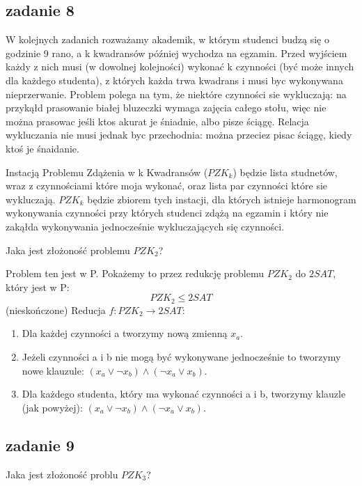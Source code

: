\documentclass[svgnames]{report}
\begin{document}
\subsection{zadanie 8}
\begin{framed}
W kolejnych zadanich rozważamy akademik, w którym studenci budzą się o godzinie 9 rano, a k kwadransów później wychodza na egzamin. Przed wyjściem każdy z nich musi (w dowolnej kolejności) wykonać k czynności (być może innych dla każdego studenta), z których każda trwa kwadrans i musi byc wykonywana nieprzerwanie. Problem polega na tym, że niektóre czynności sie wykluczają: na przykąłd prasowanie białej bluzeczki wymaga zajęcia całego stołu, więc nie można prasowac jeśli ktos akurat je śniadnie, albo pisze ściągę. Relacja wykluczania nie musi jednak byc przechodnia: można przeciez pisac ściągę, kiedy ktoś je śnaidanie.

Instacją Problemu Zdążenia w k Kwadransów ($PZK_k$) będzie lista studnetów, wraz z czynnościami które moja wykonać, oraz lista par czynności które sie wykluczają. $PZK_k$ będzie zbiorem tych instacji, dla których istnieje harmonogram wykonywania czynności przy których studenci zdążą na egzamin i który nie zakąłda wykonywania jednocześnie wykluczających się czynności.

Jaka jest złożoność problemu $PZK_2$?
\end{framed}

Problem ten jest w P.
Pokażemy to przez redukcję problemu $PZK_2$ do $2SAT$, który jest w P:
\begin{equation*}
PZK_2 \leqslant 2SAT
\end{equation*}
(nieskończone)
Reducja $f:PZK_2 \rightarrow 2SAT$:
\begin{enumerate}
	\item Dla każdej czynności a tworzymy nową zmienną $x_a$.
	\item Jeżeli czynności a i b nie mogą być wykonywane jednocześnie to tworzymy nowe klauzule: $(x_a \vee \neg x_b) \wedge (\neg x_a \vee x_b)$.
	\item Dla każdego studenta, który ma wykonać czynności a i b, tworzymy klauzle (jak powyżej): $(x_a \vee \neg x_b) \wedge (\neg x_a \vee x_b)$.
\end{enumerate}

\subsection{zadanie 9}
\begin{framed}
Jaka jest złożoność problu $PZK_3$?
\end{framed}
\end{document}

